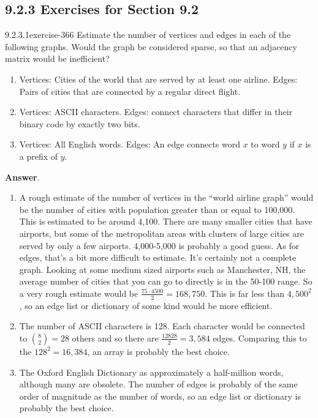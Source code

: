 \documentclass[twoside,10pt,]{book}
\numberwithin{equation}{section}
\begin{document}
\subsection*{9.2.3 Exercises for Section 9.2}
\begin{divisionsolution}{9.2.3.1}{}{exercise-366}%
\hypertarget{p-3129}{}%
Estimate the number of vertices and edges in each of the following graphs. Would the graph be considered sparse, so that an adjacency matrix would be inefficient?%
\par
\hypertarget{p-3130}{}%
\leavevmode%
\begin{enumerate}[label=(\alph*)]
\item\hypertarget{li-1512}{}\hypertarget{p-3131}{}%
Vertices: Cities of the world that are served by at least one airline. Edges: Pairs of cities that are connected by a regular direct flight.%
\item\hypertarget{li-1513}{}\hypertarget{p-3132}{}%
Vertices: ASCII characters. Edges: connect characters that differ in their binary code by exactly two bits.%
\item\hypertarget{li-1514}{}\hypertarget{p-3133}{}%
Vertices: All English words. Edges: An edge connects word \(x\) to word \(y\) if \(x\) is a prefix of \(y\).%
\end{enumerate}
%
\par\smallskip%
\noindent\textbf{Answer}.\quad%
\hypertarget{p-3134}{}%
\leavevmode%
\begin{enumerate}[label=(\alph*)]
\item\hypertarget{li-1515}{}\hypertarget{p-3135}{}%
A rough estimate of the number of vertices in the ``world airline graph'' would be the number of cities with population greater than or equal to 100,000. This is estimated to be around 4,100. There are many smaller cities that have airports, but some of the metropolitan areas with clusters of large cities are served by only a few airports.  4,000-5,000 is probably a good guess.   As for edges, that's a bit more difficult to estimate.  It's certainly not  a complete graph.  Looking at some medium sized airports such as Manchester, NH, the average number of cities that you can go to directly is in the 50-100 range.   So a very rough estimate would be   \(\frac{75 \cdot  4500}{2}=168,750\). This is far less than \(4,500^2\), so an edge list or dictionary of some kind would be more efficient.%
\item\hypertarget{li-1516}{}\hypertarget{p-3136}{}%
The number of ASCII characters is 128.  Each character would be connected to \(\binom{8}{2}=28\) others and so there are \(\frac{128 \dot 28}{2}=3,584\)  edges.  Comparing this to the \(128^2=16,384\), an array is probably the best choice.%
\item\hypertarget{li-1517}{}\hypertarget{p-3137}{}%
The Oxford English Dictionary as approximately a half-million words, although many are obsolete.   The number of edges is probably of the same order of magnitude as the number of words, so an edge list or dictionary is probably the best choice.%
\end{enumerate}
%
\end{divisionsolution}%
\end{document}
